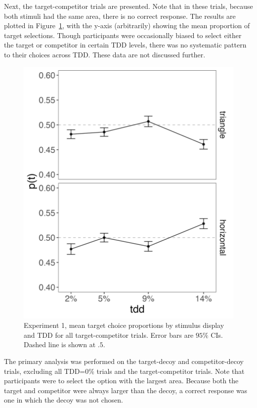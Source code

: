 Next, the target-competitor trials are presented. Note that in these trials, because both stimuli had the same area, there is no correct response. The results are plotted in Figure~\ref{fig:e1_tc}, with the y-axis (arbitrarily) showing the mean proportion of target selections. Though participants were occasionally biased to select either the target or competitor in certain TDD levels, there was no systematic pattern to their choices across TDD. These data are not discussed further.

\begin{figure}
   \centering
   \includegraphics[width=\textwidth]{figures/2afc_tc_choices.jpeg}
   \caption{Experiment 1, mean target choice proportions by stimulus display and TDD for all target-competitor trials. Error bars are $95\%$ CIs. Dashed line is shown at $.5$.}
   \label{fig:e1_tc}
\end{figure}

The primary analysis was performed on the target-decoy and competitor-decoy trials, excluding all TDD=$0\%$ trials and the target-competitor trials. Note that participants were to select the option with the largest area. Because both the target and competitor were always larger than the decoy, a correct response was one in which the decoy was not chosen. 

